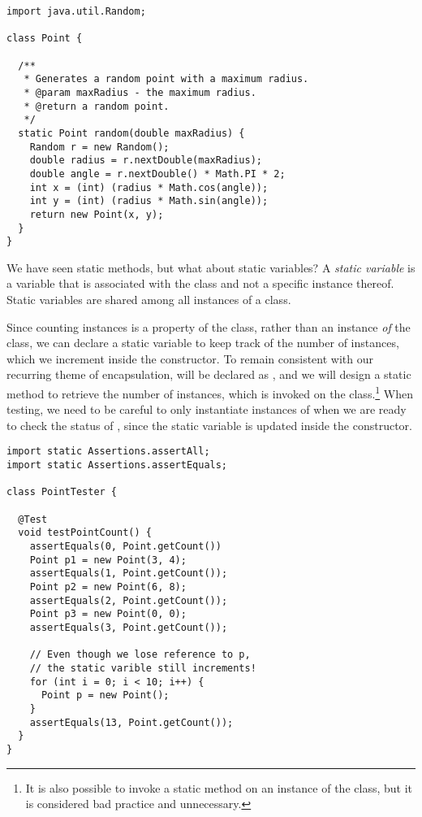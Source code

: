 \begin{lstlisting}[language=MyJava]
import java.util.Random;

class Point {

  /**
   * Generates a random point with a maximum radius.
   * @param maxRadius - the maximum radius.
   * @return a random point.
   */
  static Point random(double maxRadius) {
    Random r = new Random();
    double radius = r.nextDouble(maxRadius);
    double angle = r.nextDouble() * Math.PI * 2;
    int x = (int) (radius * Math.cos(angle));
    int y = (int) (radius * Math.sin(angle));
    return new Point(x, y);
  }
}
\end{lstlisting}

We have seen static methods, but what about static variables? 
A \emph{static variable} is a variable that is associated with the class and not a specific instance thereof. 
Static variables are shared among all instances of a class.

Since counting instances is a property of the  class, rather than an instance \emph{of} the class, we can declare a static variable  to keep track of the number of instances, which we increment inside the constructor. 
To remain consistent with our recurring theme of encapsulation,  will be declared as , and we will design a static method  to retrieve the number of instances, which is invoked on the class.\footnote{It is also possible to invoke a static method on an instance of the class, but it is considered bad practice and unnecessary.} 
When testing, we need to be careful to only instantiate instances of  when we are ready to check the status of , since the static  variable is updated inside the constructor.

\begin{lstlisting}[language=MyJava]
import static Assertions.assertAll;
import static Assertions.assertEquals;

class PointTester {

  @Test
  void testPointCount() {
    assertEquals(0, Point.getCount())
    Point p1 = new Point(3, 4);
    assertEquals(1, Point.getCount());
    Point p2 = new Point(6, 8);
    assertEquals(2, Point.getCount());
    Point p3 = new Point(0, 0);
    assertEquals(3, Point.getCount());

    // Even though we lose reference to p, 
    // the static varible still increments!
    for (int i = 0; i < 10; i++) {
      Point p = new Point();
    }
    assertEquals(13, Point.getCount());
  }
}
\end{lstlisting}

